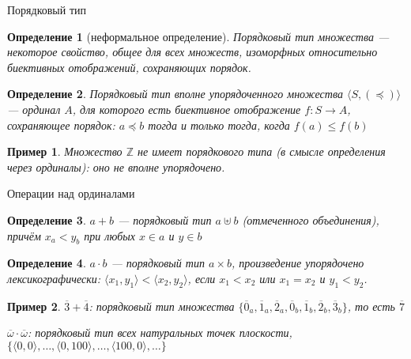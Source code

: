 \documentclass[aspectratio=169]{beamer}
\newtheorem{dfn}{Определение}[section]
\newtheorem{exm}{Пример}[section]
\begin{document}
\begin{frame}{Порядковый тип}
\begin{dfn}[неформальное определение]Порядковый тип множества --- некоторое свойство, общее для всех множеств, 
изоморфных относительно биективных отображений, сохраняющих порядок.\end{dfn}

\begin{dfn}Порядковый тип вполне упорядоченного множества $\langle S, (\preceq)\rangle$ --- ординал $A$, для которого есть биективное отображение $f: S \rightarrow A$, сохраняющее порядок:
$a \preceq b$ тогда и только тогда, когда $f(a) \le f(b)$\end{dfn}

\begin{exm}Множество $\mathbb{Z}$ не имеет порядкового типа (в смысле определения через ординалы): оно не вполне упорядочено.\end{exm}
\end{frame}

\begin{frame}{Операции над ординалами}
\begin{dfn}$a + b$ --- порядковый тип $a \uplus b$ (отмеченного объединения), причём $x_a < y_b$ при любых
$x \in a$ и $y \in b$\end{dfn}

\begin{dfn}$a \cdot b$ --- порядковый тип $a \times b$, произведение упорядочено лексикографически: $\langle x_1, y_1 \rangle < \langle x_2, y_2 \rangle$, 
если $x_1 < x_2$ или $x_1 = x_2$ и $y_1 < y_2$.\end{dfn}

\begin{exm}$\overline{3} + \overline{4}$: порядковый тип множества $\{\overline{0}_a, \overline{1}_a, \overline{2}_a, \overline{0}_b, \overline{1}_b, \overline{2}_b, \overline{3}_b\}$, то есть $\overline{7}$

$\overline{\omega} \cdot \overline{\omega}$: порядковый тип всех натуральных точек плоскости, $\{\langle 0,0 \rangle, \dots, \langle 0,100\rangle, \dots, \langle 100,0\rangle, \dots\}$\end{exm}
\end{frame}
\end{document}
